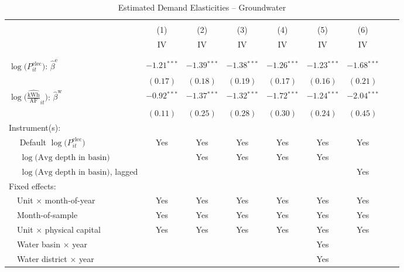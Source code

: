 \begin{table}[t!]\centering
\small
\caption{Estimated Demand Elasticities -- Groundwater  \label{tab:water_regs_main}}
\vspace{-0.1cm}
\small
\begin{adjustbox}{center} 
\begin{tabular}{lcccccccc} 
\hline \hline
\vspace{-0.37cm}
\\
 & (1)  & (2)  & (3)  & (4)  & (5)  & (6) \\ 
[0.1em]
 & IV & IV & IV & IV & IV & IV \\
\vspace{-0.37cm}
\\
\cline{2-7}
\vspace{-0.27cm}
\\
 $\log\big(P^{\text{elec}}_{it}\big)$: $\hat\beta^{\text{e}}$ ~ & 
 $-1.21$$^{***}$  & $-1.39$$^{***}$ & $-1.38$$^{***}$ & $-1.26$$^{***}$ & $-1.23$$^{***}$  & $-1.68$$^{***}$ \\ 
& $(0.17)$ & $(0.18)$ & $(0.19)$ & $(0.17)$ & $(0.16)$ & $(0.21)$ \\
[0.75em] 
 $\log\Big(\widehat{\tfrac{{\text{kWh}}}{\text{AF}}}_{it}\Big)$: $\hat\beta^{\text{w}}$ ~ & 
 $-0.92$$^{***}$  & $-1.37$$^{***}$ & $-1.32$$^{***}$ & $-1.72$$^{***}$ & $-1.24$$^{***}$  & $-2.04$$^{***}$ \\ 
[-0.3em] 
& $(0.11)$ & $(0.25)$ & $(0.28)$ & $(0.30)$ & $(0.24)$ & $(0.45)$ \\
[1.5em] 
Instrument(s): \\
[0.1em] 
~~ Default $\log\big(P^{\text{elec}}_{it}\big)$  & Yes & Yes & Yes  & Yes  & Yes & Yes \\
[0.1em] 
~~ $\log\big(\text{Avg depth in basin}\big)$  & & Yes & Yes & Yes & Yes & \\
[0.1em] 
~~ $\log\big(\text{Avg depth in basin}\big)$, lagged  & & & & & & Yes \\
[1.5em] 
Fixed effects: \\
[0.1em] 
~~Unit $\times$ month-of-year  & Yes  & Yes  & Yes  & Yes  & Yes  & Yes   \\ 
[0.1em] 
~~Month-of-sample  & Yes  & Yes  & Yes  & Yes  & Yes  & Yes   \\ 
[0.1em] 
~~Unit $\times$ physical capital & Yes & Yes & Yes & Yes & Yes & Yes  \\
[0.1em] 
~~Water basin $\times$ year & & &  & & Yes &   \\
[0.1em] 
~~Water district $\times$ year & & & & & Yes &  \\

\end{tabular}
\end{adjustbox}
\end{table}
